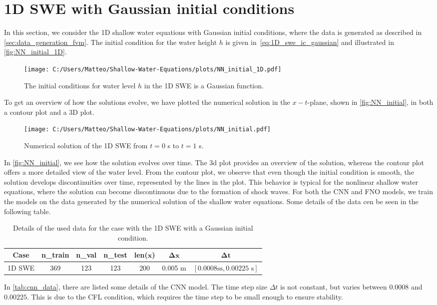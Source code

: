 \section{1D SWE with Gaussian initial conditions}
In this section, we consider the 1D shallow water equations with Gaussian initial conditions, where the data is generated as described in \autoref{sec:data_generation_fvm}.
The initial condition for the water height $h$ is given in~\eqref{eq:1D_swe_ic_gaussian} and illustrated in \autoref{fig:NN_initial_1D}.
\begin{figure}[H]
    \centering
    \texttt{[image: C:/Users/Matteo/Shallow-Water-Equations/plots/NN\_initial\_1D.pdf]}
    \caption{The initial conditions for water level $h$ in the 1D SWE is a Gaussian function.}\label{fig:NN_initial_1D}
\end{figure}
To get an overview of how the solutions evolve, we have plotted the numerical solution in the $x-t$-plane, shown in \autoref{fig:NN_initial}, in both a contour plot and a 3D plot.
\begin{figure}[H]
    \hspace{3cm} %
    \texttt{[image: C:/Users/Matteo/Shallow-Water-Equations/plots/NN\_initial.pdf]}
    \caption{Numerical solution of the 1D SWE from $t = 0$ s to $t = 1$ s.}\label{fig:NN_initial}
\end{figure}
In \autoref{fig:NN_initial}, we see how the solution evolves over time.
The 3d plot provides an overview of the solution, whereas the contour plot offers a more detailed view of the water level.
From the contour plot, we observe that even though the initial condition is smooth, the solution develops discontinuities over time, represented by the lines in the plot.
This behavior is typical for the nonlinear shallow water equations, where the solution can become discontinuous due to the formation of shock waves.
For both the CNN and FNO models, we train the models on the data generated by the numerical solution of the shallow water equations.
Some details of the data cen be seen in the following table.
\begin{table}[H]
    \centering
    \begin{tabular}{c|cccccc}
        \textbf{Case} & \textbf{n\_train} & \textbf{n\_val} & \textbf{n\_test} & \textbf{len}($\mathbf{x}$) & $\mathbf{\Delta x}$ & $\mathbf{\Delta t}$ \\
        \hline
        1D SWE & 369 & 123 & 123 & 200 & 0.005 m & $[0.0008 \text{ss}, 0.00225 \text{ s}]$ \\
    \end{tabular}
    \caption{Details of the used data for the case with the 1D SWE with a Gaussian initial condition.}\label{tab:cnn_data}
\end{table}
In \autoref{tab:cnn_data}, there are listed some details of the CNN model.
The time step size $\Delta t$ is not constant, but varies between $0.0008$ and $0.00225$.
This is due to the CFL condition, which requires the time step to be small enough to ensure stability.




